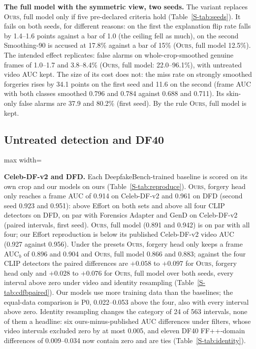 \documentclass[conference]{IEEEtran}
\newcommand{\oursB}{\textsc{Ours}, forgery head only}
\newcommand{\oursF}{\textsc{Ours}, full model}
\begin{document}
\textbf{The full model with the symmetric view, two seeds.} The variant replaces \oursF{} only if five pre-declared criteria
hold (Table~\ref{S-tab:seeds}). It fails on both seeds, for different reasons: on the first the explanation flip rate falls by
1.4--1.6 points against a bar of 1.0 (the ceiling fell as much), on the second Smoothing-90 is accused at 17.8\% against a bar of
15\% (\oursF{} 12.5\%). The intended effect replicates: false alarms on whole-crop-smoothed genuine frames of 1.0--1.7 and
3.8--8.4\% (\oursF{}: 22.0--96.1\%), with untreated video AUC kept. The size of its cost does not: the miss rate on strongly
smoothed forgeries rises by 34.1 points on the first seed and 11.6 on the second (frame AUC with both classes smoothed 0.796 and
0.784 against 0.688 and 0.711). Its skin-only false alarms are 37.9 and 80.2\% (first seed). By the rule \oursF{} is kept.

\subsection{Untreated detection and DF40}
\label{sec:detect}
\begin{table}[t]
\centering
\caption{DF40 held-out, untreated: video AUC, mean over nine face-swap (FS) and twelve reenactment (FR) methods, against the
same-domain real videos. All detectors share one crop. Intervals and paired differences in Table~\ref{S-tab:v4df40full};
entire-face synthesis in Table~\ref{S-tab:efs}.}
\label{tab:df40}
\footnotesize
\setlength{\tabcolsep}{3pt}
\begin{adjustbox}{max width=\columnwidth}\end{adjustbox}
\end{table}
\textbf{Celeb-DF-v2 and DFD.} Each DeepfakeBench-trained baseline is scored on its own crop and our models on ours
(Table~\ref{S-tab:reproduce}). \oursB{} reaches a frame AUC of 0.914 on Celeb-DF-v2 and 0.961 on DFD (second seed 0.923 and 0.951):
above Effort on both sets and above all four CLIP detectors on DFD, on par with Forensics Adapter and GenD on Celeb-DF-v2 (paired
intervals, first seed). \oursF{} (0.891 and 0.942) is on par with all four; our Effort reproduction is below its published
Celeb-DF-v2 video AUC (0.927 against 0.956). Under the presets \oursB{} keeps a frame AUC$_b$ of 0.896 and 0.904 and \oursF{} 0.866
and 0.883; against the four CLIP detectors the paired differences are $+0.058$ to $+0.097$ for \oursB{} and $+0.028$ to $+0.076$
for \oursF{} over both seeds, every interval above zero under video and identity resampling (Table~\ref{S-tab:cdfbpaired}). Our
models use more training data than the baselines; the equal-data comparison is P0, 0.022--0.053 above the four, also with every
interval above zero. Identity resampling changes the category of 24 of 563 intervals, none of them a headline: six
ours-minus-published AUC differences under filters, whose video intervals excluded zero by at most 0.005, and eleven DF40
FF++-domain differences of 0.009--0.034 now contain zero and are ties (Table~\ref{S-tab:identity}).
\end{document}
